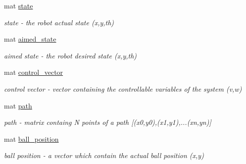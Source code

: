 \begin{DoxyCompactItemize}
mat \hyperlink{class_robot_navigation_a93eb7dd2877e1f72f5741fb396adea81}{state}
\begin{DoxyCompactList}\small\item\em state -\/ the robot actual state (x,y,th) \end{DoxyCompactList}\item 
\mbox{\label{class_robot_navigation_aaa625625a2ba01d1602891ea19691462}} 
mat \hyperlink{class_robot_navigation_aaa625625a2ba01d1602891ea19691462}{aimed\+\_\+state}
\begin{DoxyCompactList}\small\item\em aimed state -\/ the robot desired state (x,y,th) \end{DoxyCompactList}\item 
\mbox{\label{class_robot_navigation_a73838ceedac8376f3c333fcbfcd4a364}} 
mat \hyperlink{class_robot_navigation_a73838ceedac8376f3c333fcbfcd4a364}{control\+\_\+vector}
\begin{DoxyCompactList}\small\item\em control vector -\/ vector containing the controllable variables of the system (v,w) \end{DoxyCompactList}\item 
\mbox{\label{class_robot_navigation_ac427c1bf3d5df9b984f9dfe4241d1454}} 
mat \hyperlink{class_robot_navigation_ac427c1bf3d5df9b984f9dfe4241d1454}{path}
\begin{DoxyCompactList}\small\item\em path -\/ matrix containg N points of a path \mbox{[}(x0,y0),(x1,y1),...(xn,yn)\mbox{]} \end{DoxyCompactList}\item 
\mbox{\label{class_robot_navigation_a1e4f1a5b3c01ba9be911c006b478f371}} 
mat \hyperlink{class_robot_navigation_a1e4f1a5b3c01ba9be911c006b478f371}{ball\+\_\+position}
\begin{DoxyCompactList}\small\item\em ball position -\/ a vector which contain the actual ball position (x,y) \end{DoxyCompactList}\item 
\mbox{\label{class_robot_navigation_ab40654dfb4a3593172da4b285734cdf5}} 

\end{DoxyCompactItemize}
